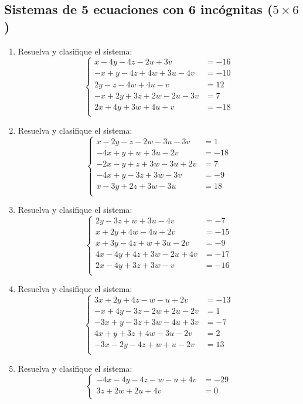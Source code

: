 \documentclass[11pt]{article}
\begin{document}
\subsection{Sistemas de 5 ecuaciones con 6 incógnitas ($ 5\times 6 $)}
\begin{enumerate}
\item Resuelva y clasifique el sistema:
\[
\left\{\begin{aligned}
x-4y-4z-2u+3v&=-16\\
-x+y-4z+4w+3u-4v&=-10\\
2y-z-4w+4u-v&=12\\
-x+2y+3z+2w-2u-3v&=7\\
2x+4y+3w+4u+v&=-18\\
\end{aligned}\right.
\]
\item Resuelva y clasifique el sistema:
\[
\left\{\begin{aligned}
x-2y-z-2w-3u-3v&=1\\
-4x+y+w+3u-2v&=-18\\
-2x-y+z+3w-3u+2v&=7\\
-4x+y-3z+3w-3v&=-9\\
x-3y+2z+3w-3u&=18\\
\end{aligned}\right.
\]
\item Resuelva y clasifique el sistema:
\[
\left\{\begin{aligned}
2y-3z+w+3u-4v&=-7\\
x+2y+4w-4u+2v&=-15\\
x+3y-4z+w+3u-2v&=-9\\
4x-4y+4z+3w-2u+4v&=-17\\
2x-4y+3z+3w-v&=-16\\
\end{aligned}\right.
\]
\item Resuelva y clasifique el sistema:
\[
\left\{\begin{aligned}
3x+2y+4z-w-u+2v&=-13\\
-x+4y-3z-2w+2u-2v&=1\\
-3x+y-3z+3w-4u+3v&=-7\\
4x+y+3z+4w-3u-2v&=2\\
-3x-2y-4z+w+u-2v&=13\\
\end{aligned}\right.
\]
\item Resuelva y clasifique el sistema:
\[
\left\{\begin{aligned}
-4x-4y-4z-w-u+4v&=-29\\
3z+2w+2u+4v&=0\\

\end{aligned}\]
\end{enumerate}
\end{document}
